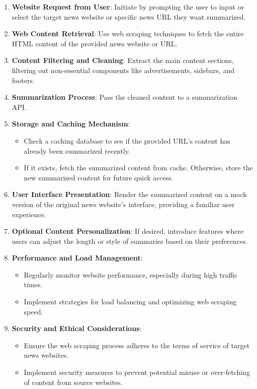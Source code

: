 \documentclass[a4paper]{article}
\begin{document}
\begin{enumerate}
    \item {\bf Website Request from User}: Initiate by prompting the user to input or select the target news website or specific news URL they want summarized.
    \item {\bf Web Content Retrieval}: Use web scraping techniques to fetch the entire HTML content of the provided news website or URL.
    \item {\bf Content Filtering and Cleaning}: Extract the main content sections, filtering out non-essential components like advertisements, sidebars, and footers.
    \item {\bf Summarization Process}: Pass the cleaned content to a summarization API.
    \item {\bf Storage and Caching Mechanism}:
        \begin{itemize}
            \item Check a caching database to see if the provided URL's content has already been summarized recently.
            \item If it exists, fetch the summarized content from cache. Otherwise, store the new summarized content for future quick access.
        \end{itemize}
    \item {\bf User Interface Presentation}: Render the summarized content on a mock version of the original news website's interface, providing a familiar user experience.
    \item {\bf Optional Content Personalization}: If desired, introduce features where users can adjust the length or style of summaries based on their preferences.
    \item {\bf Performance and Load Management}:
        \begin{itemize}
            \item Regularly monitor website performance, especially during high traffic times.
            \item Implement strategies for load balancing and optimizing web scraping speed.
        \end{itemize}
    \item {\bf Security and Ethical Considerations}:
        \begin{itemize}
            \item Ensure the web scraping process adheres to the terms of service of target news websites.
            \item Implement security measures to prevent potential misuse or over-fetching of content from source websites.

\end{itemize}
\end{enumerate}
\end{document}
